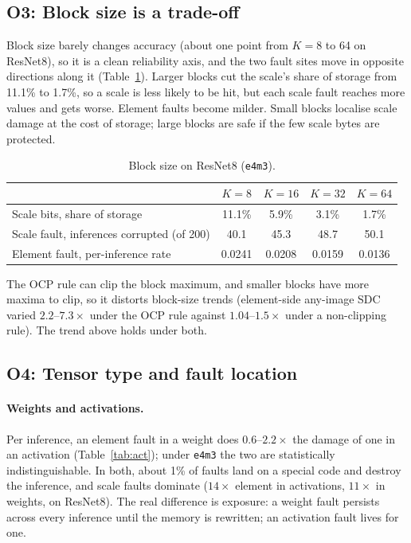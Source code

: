 \documentclass[12pt,a4paper]{article}
\newcommand{\fmt}[1]{\texttt{#1}}
\begin{document}
\subsection{O3: Block size is a trade-off}

Block size barely changes accuracy (about one point from $K=8$ to 64 on ResNet8), so it is a
clean reliability axis, and the two fault sites move in opposite directions along it
(Table~\ref{tab:block}). Larger blocks cut the scale's share of storage from 11.1\% to 1.7\%,
so a scale is less likely to be hit, but each scale fault reaches more values and gets worse.
Element faults become milder. Small blocks localise scale damage at the cost of storage; large
blocks are safe if the few scale bytes are protected.

\begin{table}[H]
\centering
\caption{Block size on ResNet8 (\fmt{e4m3}).}
\label{tab:block}
\small
\begin{tabular}{lcccc}
\toprule
 & $K=8$ & $K=16$ & $K=32$ & $K=64$ \\
\midrule
Scale bits, share of storage            & 11.1\% & 5.9\% & 3.1\% & 1.7\% \\
Scale fault, inferences corrupted (of 200) & 40.1 & 45.3 & 48.7 & 50.1 \\
Element fault, per-inference rate        & 0.0241 & 0.0208 & 0.0159 & 0.0136 \\
\bottomrule
\end{tabular}
\end{table}

\noindent The OCP rule can clip the block maximum, and smaller blocks have more maxima to clip,
so it distorts block-size trends (element-side any-image SDC varied $2.2$--$7.3\times$ under the
OCP rule against $1.04$--$1.5\times$ under a non-clipping rule). The trend above holds under both.

\subsection{O4: Tensor type and fault location}

\paragraph{Weights and activations.} Per inference, an element fault in a weight does
$0.6$--$2.2\times$ the damage of one in an activation (Table~\ref{tab:act}); under \fmt{e4m3}
the two are statistically indistinguishable. In both, about 1\% of faults land on a special code
and destroy the inference, and scale faults dominate ($14\times$ element in activations,
$11\times$ in weights, on ResNet8). The real difference is exposure: a weight fault persists
across every inference until the memory is rewritten; an activation fault lives for one.
\end{document}
